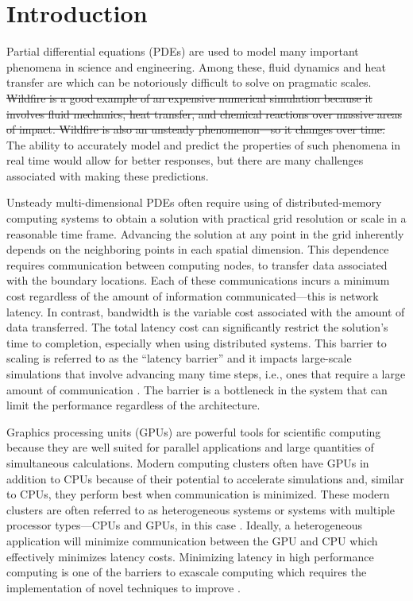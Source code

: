 \documentclass[mca,article,submit,moreauthors,pdftex]{Definitions/mdpi}
\newcommand{\revised}[2]{{\sloppy\cbcolor{#2}\textcolor{#2}{\cbstart {#1} \cbend}}}  %
\newcommand{\former}[2]{\sloppy\cbcolor{#2}\textcolor{#2}{\cbdelete\sout{#1}}}
\begin{document}
\section{Introduction}
Partial differential equations (PDEs) are used to model many important phenomena in science and engineering. 
Among these, fluid dynamics and heat transfer are which can be notoriously difficult to solve on pragmatic scales. \former{Wildfire is a good example of an expensive numerical simulation because it involves fluid mechanics, heat transfer, and chemical reactions over massive areas of impact. Wildfire is also an unsteady phenomenon---so it changes over time.}{revTwo} 
The ability to accurately model and predict the properties of such phenomena in real time would allow for better responses, but there are many challenges associated with making these predictions.

Unsteady multi-dimensional PDEs often require using of distributed-memory computing systems to obtain a solution with practical grid resolution or scale in a reasonable time frame. Advancing the solution at any point in the grid inherently depends on the neighboring points in each spatial dimension. This dependence requires communication between computing nodes, to transfer data associated with the boundary locations. Each of these communications incurs a minimum cost regardless of the amount of information communicated---this is network latency. In contrast, bandwidth is the variable cost associated with the amount of data transferred. The total latency cost can significantly restrict the solution's time to completion, especially when using distributed systems. This barrier to scaling is referred to as the ``latency barrier'' and it impacts large-scale simulations that involve advancing many time steps, i.e., ones that require a large amount of communication \cite{Alhubail2016ThePDEs}. The barrier is a bottleneck in the system that can limit the performance regardless of the architecture.

Graphics processing units (GPUs) are powerful tools for scientific computing because they are well suited for parallel applications and large quantities of simultaneous calculations. Modern computing clusters often have GPUs in addition to CPUs because of their potential to accelerate simulations and, similar to CPUs, they perform best when communication is minimized. These modern clusters are often referred to as heterogeneous systems or systems with multiple processor types---CPUs and GPUs, in this case \cite{owens2007survey,owens2008gpu}. 
Ideally, a heterogeneous application will minimize communication between the GPU and CPU which effectively minimizes latency costs. Minimizing latency in high performance computing is one of the barriers to exascale computing which requires the implementation of novel techniques to improve \cite{Alexandrov2016RouteSkills}.
\end{document}

